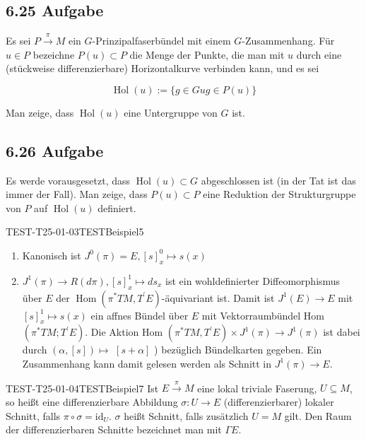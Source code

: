 \subsection*{6.25 Aufgabe}
Es sei $P \xrightarrow{\pi} M$ ein $G$-Prinzipalfaserbündel mit einem $G$-Zusammenhang. Für $u \in P$ bezeichne $P(u) \subset P$ die Menge der Punkte, die man mit $u$ durch eine (stückweise differenzierbare) Horizontalkurve verbinden kann, und es sei

$$
\operatorname{Hol}(u):=\{g \in G u g \in P(u)\}
$$

Man zeige, dass $\operatorname{Hol}(u)$ eine Untergruppe von $G$ ist.

\subsection*{6.26 Aufgabe}
Es werde vorausgesetzt, dass $\operatorname{Hol}(u) \subset G$ abgeschlossen ist (in der Tat ist das immer der Fall). Man zeige, dass $P(u) \subset P$ eine Reduktion der Strukturgruppe von $P$ auf $\operatorname{Hol}(u)$ definiert.





\begin{EXA}{TEST-T25-01-03}{TESTBeispiel5}
\begin{enumerate}
  \item Kanonisch ist $J^{0}(\pi)=E,[s]_{x}^{0} \mapsto s(x)$
  \item $J^{1}(\pi) \rightarrow R(d \pi),[s]_{x}^{1} \mapsto d s_{x}$ ist ein wohldefinierter Diffeomorphismus über $E$ der $\operatorname{Hom}\left(\pi^{*} T M, T^{\prime} E\right)$-äquivariant ist. Damit ist $J^{1}(E) \rightarrow E$ mit $[s]_{x}^{1} \mapsto s(x)$ ein affnes Bündel über $E$ mit Vektorraumbündel Hom $\left(\pi^{*} T M ; T^{\prime} E\right)$. Die Aktion Hom $\left(\pi^{*} T M, T^{\prime} E\right) \times J^{1}(\pi) \rightarrow J^{1}(\pi)$ ist dabei durch $(\alpha,[s]) \mapsto$ $[s+\alpha]$ ) bezüglich Bündelkarten gegeben. Ein Zusammenhang kann damit gelesen werden als Schnitt in $J^{1}(\pi) \rightarrow E$.
\end{enumerate}
\end{EXA}

\begin{EXA}{TEST-T25-01-04}{TESTBeispiel7}
Ist $E \xrightarrow{\pi} M$ eine lokal triviale Faserung, $U \subseteq M$, so heißt eine differenzierbare Abbildung $\sigma: U \rightarrow E$ (differenzierbarer) lokaler Schnitt, falls $\pi \circ \sigma=\mathrm{id}_{U}$. $\sigma$ heißt Schnitt, falls zusätzlich $U=M$ gilt. Den Raum der differenzierbaren Schnitte bezeichnet man mit $\Gamma E$.
\end{EXA}

